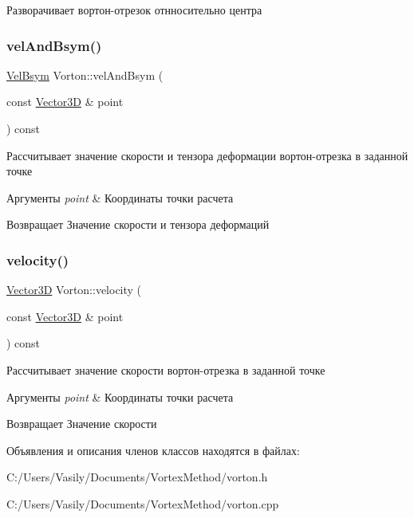 Разворачивает вортон-\/отрезок отнносительно центра \mbox{\label{class_vorton_a3e4d19e72822aa20be8482046c3e5598}} 
\subsubsection{\texorpdfstring{vel\+And\+Bsym()}{velAndBsym()}}
{\footnotesize\ttfamily \mbox{\hyperlink{struct_vel_bsym}{Vel\+Bsym}} Vorton\+::vel\+And\+Bsym (\begin{DoxyParamCaption}\item[{const \mbox{\hyperlink{class_vector3_d}{Vector3D}} \&}]{point }\end{DoxyParamCaption}) const}

Рассчитывает значение скорости и тензора деформации вортон-\/отрезка в заданной точке 
\begin{DoxyParams}{Аргументы}
{\em point} & Координаты точки расчета \\
\hline
\end{DoxyParams}
\begin{DoxyReturn}{Возвращает}
Значение скорости и тензора деформаций 
\end{DoxyReturn}
\mbox{\label{class_vorton_a8c693ef015b7acc843ec32c80e042a4f}} 
\subsubsection{\texorpdfstring{velocity()}{velocity()}}
{\footnotesize\ttfamily \mbox{\hyperlink{class_vector3_d}{Vector3D}} Vorton\+::velocity (\begin{DoxyParamCaption}\item[{const \mbox{\hyperlink{class_vector3_d}{Vector3D}} \&}]{point }\end{DoxyParamCaption}) const}

Рассчитывает значение скорости вортон-\/отрезка в заданной точке 
\begin{DoxyParams}{Аргументы}
{\em point} & Координаты точки расчета \\
\hline
\end{DoxyParams}
\begin{DoxyReturn}{Возвращает}
Значение скорости 
\end{DoxyReturn}


Объявления и описания членов классов находятся в файлах\+:\begin{DoxyCompactItemize}
\item 
C\+:/\+Users/\+Vasily/\+Documents/\+Vortex\+Method/vorton.\+h\item 
C\+:/\+Users/\+Vasily/\+Documents/\+Vortex\+Method/vorton.\+cpp\end{DoxyCompactItemize}
